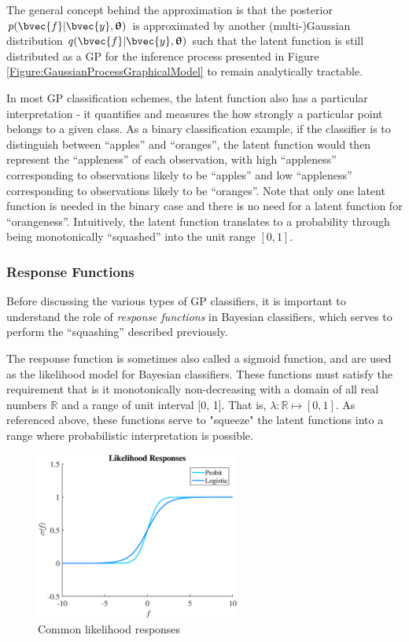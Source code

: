 			The general concept behind the approximation is that the posterior $p(\bvec{f} | \bvec{y}, \vec{\uptheta})$ is approximated by another (multi-)Gaussian distribution $q(\bvec{f} | \bvec{y}, \vec{\uptheta})$ such that the latent function is still distributed as a GP for the inference process presented in Figure \ref{Figure:GaussianProcessGraphicalModel} to remain analytically tractable.
			
			In most GP classification schemes, the latent function also has a particular interpretation - it quantifies and measures the how strongly a particular point belongs to a given class. As a binary classification example, if the classifier is to distinguish between ``apples'' and ``oranges'', the latent function would then represent the ``appleness'' of each observation, with high ``appleness'' corresponding to observations likely to be ``apples'' and low ``appleness'' corresponding to observations likely to be ``oranges''. Note that only one latent function is needed in the binary case and there is no need for a latent function for ``orangeness''. Intuitively, the latent function translates to a probability through being monotonically ``squashed'' into the unit range $[0, 1]$.
			
			\subsubsection{Response Functions}
			\label{Background:GaussianProcesses:Classification:ResponseFunction}
			
				Before discussing the various types of GP classifiers, it is important to understand the role of \textit{response functions} in Bayesian classifiers, which serves to perform the ``squashing'' described previously.
				
				The response function is sometimes also called a sigmoid function, and are used as the likelihood model for Bayesian classifiers. These functions must satisfy the requirement that is it monotonically non-decreasing with a domain of all real numbers $\mathbb{R}$ and a range of unit interval [0, 1]. That is, $\lambda: \mathbb{R} \mapsto [0, 1]$. As referenced above, these functions serve to "squeeze" the latent functions into a range where probabilistic interpretation is possible.
				
				\begin{figure}[!htbp]
					\centering
						\includegraphics[width=0.6\textwidth]{Figures/responses.eps}
					\caption{Common likelihood responses}
					\label{Figure:LikelihoodResponses}
				\end{figure}
				
